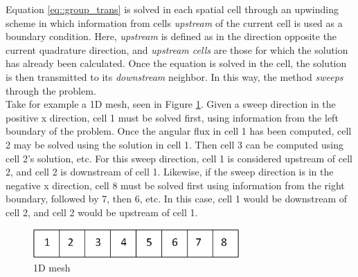 \documentclass{article}
\begin{document}
Equation \ref{eq::group_trans} is solved in each spatial cell through an upwinding scheme in which information from cells \emph{upstream} of the current cell is used as a boundary condition. Here, \emph{upstream} is defined as in the direction opposite the current quadrature direction, and \emph{upstream cells} are those for which the solution has already been calculated. Once the equation is solved in the cell, the solution is then transmitted to its \emph{downstream} neighbor. In this way, the method \emph{sweeps} through the problem. \\

Take for example a 1D mesh, seen in Figure \ref{fig::1Dmesh}. Given a sweep direction in the positive x direction, cell 1 must be solved first, using information from the left boundary of the problem. Once the angular flux in cell 1 has been computed, cell 2 may be solved using the solution in cell 1. Then cell 3 can be computed using cell 2's solution, etc. For this sweep direction, cell 1 is considered upstream of cell 2, and cell 2 is downstream of cell 1. Likewise, if the sweep direction is in the negative x direction, cell 8 must be solved first using information from the right boundary, followed by 7, then 6, etc. In this case, cell 1 would be downstream of cell 2, and cell 2 would be upstream of cell 1.

\begin{figure}[ht!]
  \begin{center}
  \includegraphics[width=0.7\textwidth]{Images/1D_sweep.png}
    \caption[]{1D mesh}\label{fig::1Dmesh}
  \end{center}
\end{figure}
\end{document}
